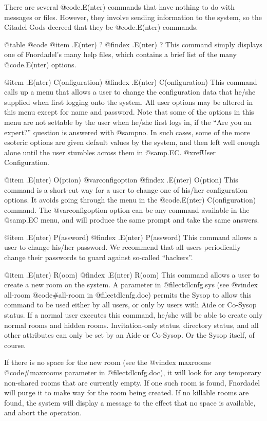 There are several @code{.E(nter)} commands that have nothing to do with
messages or files.  However, they involve sending information to the system,
so the Citadel Gods decreed that they be @code{.E(nter)} commands.

@table @code
@item .E(nter) ?
@findex .E(nter) ?
This command simply displays one of Fnordadel's many help
files, which contains a brief list of the many @code{.E(nter)} options.

@item .E(nter) C(onfiguration)
@findex .E(nter) C(onfiguration)
This command calls up a menu that allows a user to change the
configuration data that he/she supplied when first logging onto the
system.  All user options may be altered in this menu except for name
and password.  Note that some of the options in this menu are not
settable by the user when he/she first logs in, if the ``Are you an
expert?'' question is answered with @samp{no}.  In such cases, some of the
more esoteric options are given default values by the system, and then
left well enough alone until the user stumbles across them in @samp{.EC}.
@xref{User Configuration}.

@item .E(nter) O(ption) @var{configoption}
@findex .E(nter) O(ption)
This command is a short-cut way for a user to change one of
his/her configuration options.  It avoids going through the menu in
the @code{.E(nter) C(onfiguration)} command.  The @var{configoption} option can
be any command available in the @samp{.EC} menu, and will produce the same
prompt and take the same answers.

@item .E(nter) P(assword)
@findex .E(nter) P(assword)
This command allows a user to change his/her password.  We
recommend that all users periodically change their passwords to guard
against so-called ``hackers''.

@item .E(nter) R(oom)
@findex .E(nter) R(oom)
This command allows a user to create a new room on the system.
A parameter in @file{ctdlcnfg.sys} (see
@vindex all-room
@code{#all-room} in @file{ctdlcnfg.doc}) permits
the Sysop to allow this command to be used either by all users, or
only by users with Aide or Co-Sysop status.  If a normal user executes
this command, he/she will be able to create only normal rooms and
hidden rooms.  Invitation-only status, directory status, and all other
attributes can only be set by an Aide or Co-Sysop.  Or the Sysop itself,
of course.

If there is no space for the new room (see the
@vindex maxrooms
@code{#maxrooms}
parameter in @file{ctdlcnfg.doc}), it will look for any temporary non-shared
rooms that
are currently empty.  If one such room is found, Fnordadel will
purge it to make way for the room being created.  If no killable rooms
are found, the system will display a message to the effect that no
space is available, and abort the operation.

